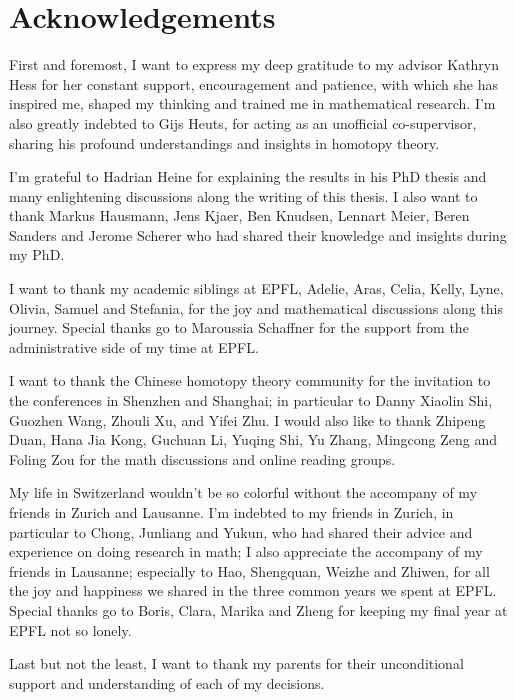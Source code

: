 \chapter*{Acknowledgements}
{
        First and foremost, I want to express my deep gratitude to my advisor Kathryn Hess for her constant support, encouragement and patience, with which she has inspired me, shaped my thinking and trained me in mathematical research.
        I'm also greatly indebted to Gijs Heuts, for acting as an unofficial co-supervisor, sharing his profound understandings and insights in homotopy theory. 

        I'm grateful to Hadrian Heine for explaining the results in his PhD thesis and many enlightening discussions along the writing of this thesis. I also want to thank Markus Hausmann, Jens Kjaer, Ben Knudsen, Lennart Meier, Beren Sanders and Jerome Scherer who had shared their knowledge and insights during my PhD.
        
        I want to thank my academic siblings at EPFL, Adelie, Aras, Celia, Kelly, Lyne, Olivia, Samuel and Stefania, for the joy and mathematical discussions along this journey.
        Special thanks go to Maroussia Schaffner for the support from the administrative side of my time at EPFL.
        
        I want to thank the Chinese homotopy theory community for the invitation to the conferences in Shenzhen and Shanghai;
        in particular to Danny Xiaolin Shi, Guozhen Wang, Zhouli Xu, and Yifei Zhu. 
        I would also like to thank Zhipeng Duan, Hana Jia Kong, Guchuan Li, Yuqing Shi, Yu Zhang, Mingcong Zeng and Foling Zou for the math discussions and online reading groups.
        
        My life in Switzerland wouldn't be so colorful without the accompany of my friends in Zurich and Lausanne. I'm indebted to my friends in Zurich, in particular to Chong, Junliang and Yukun, who had shared their advice and experience on doing research in math;
        I also appreciate the accompany of my friends in Lausanne; especially to Hao, Shengquan, Weizhe and Zhiwen, for all the joy and happiness we shared in the three common years we spent at EPFL.
        Special thanks go to Boris, Clara, Marika and Zheng for keeping my final year at EPFL not so lonely.
        
        Last but not the least, I want to thank my parents for their unconditional support and understanding of each of my decisions.
        
    }
